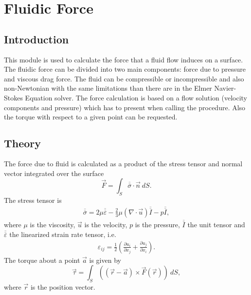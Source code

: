 \chapter{Fluidic Force}



\section{Introduction}

This module is used to calculate the force that a fluid flow induces
on a surface. The fluidic force can be divided into two main
components: force due to pressure and viscous drag force. The fluid
can be compressible or incompressible and also non-Newtonian with the
same limitations than there are in the Elmer Navier-Stokes Equation
solver. The force calculation is based on a flow solution (velocity
components and pressure) which has to present when calling the
procedure. Also the torque with respect to a given point can be
requested.


\section{Theory}

The force due to fluid is calculated as a product of the stress
tensor and normal vector integrated over the surface
\begin{equation}
\vec F = \int_S \overline{\overline\sigma}\cdot\vec n~dS.
\end{equation}
The stress tensor is
\begin{eqnarray}
\overline{\overline\sigma} = 2\mu \overline{\overline\varepsilon}
-\frac{2}{3} \mu (\nabla\cdot\vec u)\overline{\overline I} - p 
\overline{\overline I},
\end{eqnarray}
where $\mu$ is the viscosity, $\vec{u}$ is the velocity, $p$ is the
pressure, $\overline{\overline I}$ the unit tensor and
$\overline{\overline \varepsilon}$ the linearized strain rate tensor,
i.e.
\begin{eqnarray}
\varepsilon_{ij} = \frac{1}{2}\left( \frac{\partial u_i}{\partial x_j} +
\frac{\partial u_j}{\partial x_i}
\right).
\end{eqnarray}
The torque about a point $\vec a$ is given by 
\begin{equation}
\vec \tau = \int_S \left((\vec r-\vec a)\times\vec F(\vec r)\right)~dS,
\end{equation}
where $\vec r$ is the position vector.


